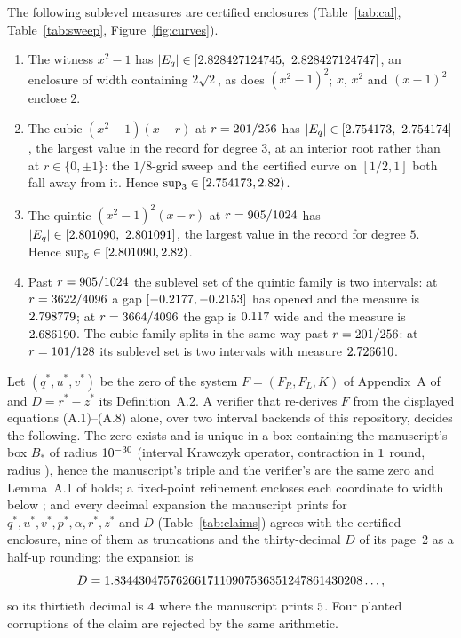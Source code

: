 \documentclass[11pt]{article}
\newcommand{\meas}[1]{\lvert #1 \rvert}
\begin{document}
\begin{proposition}\label{prop:land}
The following sublevel measures are certified enclosures (Table~\ref{tab:cal},
Table~\ref{tab:sweep}, Figure~\ref{fig:curves}).
\begin{enumerate}
\item The witness $x^2-1$ has $\meas{E_q}\in\WitnessEnclosure$, an enclosure of width
\WitnessWidth containing $2\sqrt2$, as does $(x^2-1)^2$; $x$, $x^2$ and $(x-1)^2$ enclose $2$.
\item The cubic $(x^2-1)(x-r)$ at $r=201/256$ has $\meas{E_q}\in\CubicChampion$, the largest
value in the record for degree $3$, at an interior root rather than at $r\in\{0,\pm1\}$: the
$1/8$-grid sweep and the certified curve on $[1/2,1]$ both fall away from it. Hence
$\sup_3\in[2.754173,2.82)$.
\item The quintic $(x^2-1)^2(x-r)$ at $r=905/1024$ has $\meas{E_q}\in\QuinticPeak$, the
largest value in the record for degree $5$. Hence $\sup_5\in[2.801090,2.82)$.
\item Past $r=905/1024$ the sublevel set of the quintic family is two intervals: at
$r=3622/4096$ a gap $[-0.2177,-0.2153]$ has opened and the measure is
$2.798779$; at $r=3664/4096$ the gap is $0.117$ wide and the measure is
$2.686190$. The cubic family splits in the same way past $r=201/256$: at $r=101/128$
its sublevel set is two intervals with measure $2.726610$.
\end{enumerate}
\end{proposition}

\begin{proposition}\label{prop:dec}
Let $(q^*,u^*,v^*)$ be the zero of the system $F=(F_R,F_L,K)$ of Appendix~A of \cite{DPT} and
$D=r^*-z^*$ its Definition~A.2. A verifier that re-derives $F$ from the displayed equations
(A.1)--(A.8) alone, over two interval backends of this repository, decides the following.
The zero exists and is unique in a box containing the manuscript's box $B_*$ of radius
$10^{-30}$ (interval Krawczyk operator, contraction in $1$ round, radius
\KrawczykRad), hence the manuscript's triple and the verifier's are the same zero and
Lemma~A.1 of \cite{DPT} holds; a fixed-point refinement encloses each coordinate to width below
\WidthWorst; and every decimal expansion the manuscript prints for $q^*,u^*,v^*,p^*,\alpha,
r^*,z^*$ and $D$ (Table~\ref{tab:claims}) agrees with the certified enclosure, nine of them as
truncations and the thirty-decimal $D$ of its page~2 as a half-up rounding: the expansion is
\[
D=1.8344304757626617110907536351247861430208\ldots,
\]
so its thirtieth decimal is $4$ where the manuscript prints
$5$. Four planted corruptions of the claim are rejected by the same arithmetic.
\end{proposition}
\end{document}
